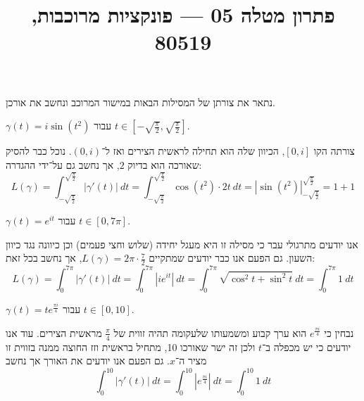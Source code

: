 
\title{פתרון מטלה 05 --- פונקציות מרוכבות, 80519}


\maketitle
\maketitleprint{}

\question{}
נתאר את צורתן של המסילות הבאות במישור המרוכב ונחשב את אורכן.

\subquestion{}
$\gamma(t) = i \sin(t^2)$ עבור $t \in [-\sqrt{\frac{\pi}{2}}, \sqrt{\frac{\pi}{2}}]$.
\begin{solution}
	צורתה הקו $[0, i]$, הכיוון שלה הוא תחילה לראשית הצירים ואז ל־$(0, i)$.
	נוכל כבר להסיק שאורכה הוא בדיוק $2$, אך נחשב גם על־ידי ההגדרה:
	\[
		L(\gamma)
		= \int_{-\sqrt{\frac{\pi}{2}}}^{\sqrt{\frac{\pi}{2}}} |\gamma'(t)|\ dt
		= \int_{-\sqrt{\frac{\pi}{2}}}^{\sqrt{\frac{\pi}{2}}} \cos(t^2) \cdot 2t\ dt
		= |\sin(t^2)|_{-\sqrt{\frac{\pi}{2}}}^{\sqrt{\frac{\pi}{2}}}
		= 1 + 1
	\]
\end{solution}

\subquestion{}
$\gamma(t) = e^{it}$ עבור $t \in [0, 7\pi]$.
\begin{solution}
	אנו יודעים מתרגולי עבר כי מסילה זו היא מעגל יחידה (שלוש וחצי פעמים) וכן כיוונה נגד כיוון השעון.
	גם הפעם אנו כבר יודעים שמתקיים $L(\gamma) = 2\pi \cdot \frac{7}{2}$, אך נחשב בכל זאת:
	\[
		L(\gamma)
		= \int_0^{7\pi} |\gamma'(t)|\ dt
		= \int_0^{7\pi} |i e^{it}|\ dt
		= \int_0^{7\pi} \sqrt{\cos^2 t + \sin^2 t}\ dt
		= \int_0^{7\pi} 1\ dt
	\]
\end{solution}

\subquestion{}
$\gamma(t) = t e^{\frac{\pi i}{4}}$ עבור $t \in [0, 10]$.
\begin{solution}
	נבחין כי $e^{\frac{\pi i}{4}}$ הוא ערך קבוע ומשמעותו שלעקומה תהיה זווית של $\frac{\pi}{4}$ מראשית הצירים. עוד אנו יודעים כי יש מכפלה ב־$t$ ולכן זה ישר שאורכו 10, מתחיל בראשית וזז החוצה ממנה בזווית זו מציר ה־$x$.
	גם הפעם אנו יודעים את האורך אך נחשב
	\[
		\int_0^{10} |\gamma'(t)|\ dt
		= \int_0^{10} |e^{\frac{\pi i}{4}}|\ dt
		= \int_0^{10} 1\ dt
	\]
\end{solution}

